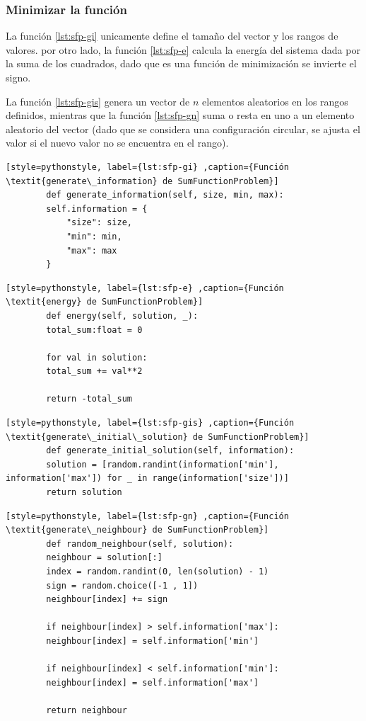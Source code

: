 \documentclass[12pt,twoside]{article}
\begin{document}
	\subsubsection{Minimizar la función}
	
	La función \ref{lst:sfp-gi} unicamente define el tamaño del vector y los rangos de valores. por otro lado, la función \ref{lst:sfp-e} calcula la energía del sistema dada por la suma de los cuadrados, dado que es una función de minimización se invierte el signo.
	
	La función \ref{lst:sfp-gis} genera un vector de $n$ elementos aleatorios en los rangos definidos, mientras que la función \ref{lst:sfp-gn} suma  o resta en uno a un elemento aleatorio del vector (dado que se considera una configuración circular, se ajusta el valor si el nuevo valor no se encuentra en el rango).
	
	\begin{lstlisting}[style=pythonstyle, label={lst:sfp-gi} ,caption={Función \textit{generate\_information} de SumFunctionProblem}]
		def generate_information(self, size, min, max):
		self.information = {
			"size": size,
			"min": min,
			"max": max
		}
	\end{lstlisting}
	
	\begin{lstlisting}[style=pythonstyle, label={lst:sfp-e} ,caption={Función \textit{energy} de SumFunctionProblem}]
		def energy(self, solution, _):
		total_sum:float = 0
		
		for val in solution:
		total_sum += val**2
		
		return -total_sum
	\end{lstlisting}
	
	\begin{lstlisting}[style=pythonstyle, label={lst:sfp-gis} ,caption={Función \textit{generate\_initial\_solution} de SumFunctionProblem}]
		def generate_initial_solution(self, information):
		solution = [random.randint(information['min'], information['max']) for _ in range(information['size'])]
		return solution
	\end{lstlisting}
	
	\begin{lstlisting}[style=pythonstyle, label={lst:sfp-gn} ,caption={Función \textit{generate\_neighbour} de SumFunctionProblem}]
		def random_neighbour(self, solution):
		neighbour = solution[:]
		index = random.randint(0, len(solution) - 1)
		sign = random.choice([-1 , 1])
		neighbour[index] += sign
		
		if neighbour[index] > self.information['max']:
		neighbour[index] = self.information['min']
		
		if neighbour[index] < self.information['min']:
		neighbour[index] = self.information['max']
		
		return neighbour
	\end{lstlisting}
	
\end{document}
